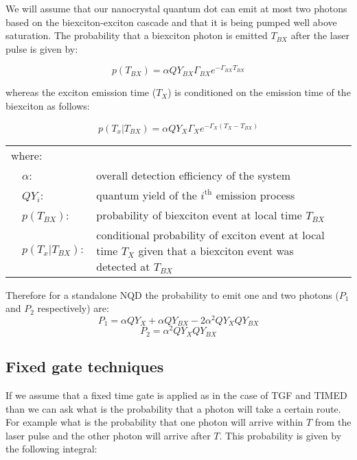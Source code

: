 \documentclass[reprint,onecolumn]{revtex4-1}
\begin{document}
We will assume that our nanocrystal quantum dot can emit at most two
photons based on the biexciton-exciton cascade and that it is being
pumped well above saturation. The probability that a biexciton photon
is emitted $T_{BX}$ after the laser pulse is given by:

\begin{equation*}
p(T_{BX})=\alpha QY_{BX}\Gamma_{BX}e^{-\Gamma_{BX}T_{BX}}
\end{equation*}

whereas the exciton emission time ($T_{X}$) is conditioned on the
emission time of the biexciton as follows:

\begin{equation*}
p\left(T_{x}\right|\left.T_{BX}\right)=\alpha QY_{X}\Gamma_{X}e^{-\Gamma_{X}\left(T_{X}-T_{BX}\right)}
\end{equation*}

\begin{tabular}{llp{13 cm}l}
\multicolumn{2}{l}{where:} & \tabularnewline
 & $\alpha$: & overall detection efficiency of the system\tabularnewline
 & $QY_{i}$: & quantum yield of the $i^{\text{th}}$ emission process\tabularnewline
 & $p(T_{BX})$: & probability of biexciton event at local time $T_{BX}$\tabularnewline
 & $p\left(T_{x}\right|\left.T_{BX}\right):$ &{conditional probability of exciton event at local time $T_{X}$ given
that a biexciton event was detected at $T_{BX}$}\tabularnewline
\end{tabular}

Therefore for a standalone NQD the probability to emit one and two photons ($P_1$ and $P_2$ respectively) are:
\begin{equation*}
P_1=\alpha QY_X + \alpha QY_{BX} - 2 \alpha^2 QY_X QY_{BX} 
\end{equation*}
\begin{equation*}
P_2=\alpha^2 QY_X QY_{BX} 
\end{equation*}
\subsection{Fixed gate techniques}

If we assume that a fixed time gate is applied as in the case of TGF
and TIMED than we can ask what is the probability that a photon will
take a certain route. For example what is the probability that one
photon will arrive within $T$ from the laser pulse and the other
photon will arrive after $T$. This probability is given by the following
integral:
\end{document}
